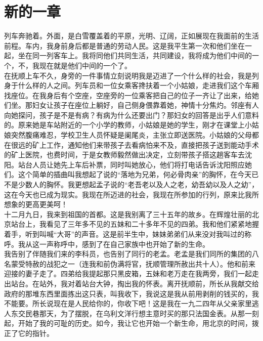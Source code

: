 \fancyhead[RO]{} %
\fancyhead[LE]{} %
\chapter*{新的一章}
\thispagestyle{empty}
列车奔驰着。外面，是白雪覆盖着的平原，光明、辽阔，正如展现在我面前的生活前程。车内，我身前身后都是普通的劳动人民。这是我平生第一次和他们坐在一起，坐在同一列客车上。我将同他们共同生活，共同建设，我将成为他们中间的一个，不，我现在就是他们中间的一个了。\\

在抚顺上车不久，身旁的一件事情立刻说明我是迈进了一个什么样的社会，我是列身于什么样的人之间。列车员和一位女乘客搀扶着一个小姑娘，走进我们这个车厢找座位。在我身后有个空座，空座旁的一位乘客把自己的位子一齐让了出来，给她们坐。那妇女让孩子在座位上躺好，自己侧身偎靠着她，神情十分焦灼。邻座有人向她探问，孩子是不是有病？有病为什么还要出门？那妇女的回答是出乎人们意料的。原来她是车站附近的一个小学的教师，小姑娘是她的学生，刚才在课堂上小姑娘突然腹痛难忍，学校卫生人员怀疑是阑尾炎，主张立即送医院。小姑娘的父母都在很远的矿上工作，通知他们来带孩子去看病怕来不及，直接把孩子送到能动手术的矿上医院，也费时间，于是女教师毅然做出决定，立刻带孩子搭这趟客车去沈阳。站台人员让她先上车后补票，同时叫她放心，他们将打电话告诉沈阳照应她们。这个简单的插曲叫我想起了说的“落地为兄弟，何必骨肉亲”的胸怀，在今天已不是少数人的胸怀。我更想起孟子说的“老吾老以及人之老，幼吾幼以及人之幼”，这在今天也已成为现实。我现在所迈进的社会，我现在所参加的行列，原来比我所想象的更高更美呵！\\

十二月九日，我来到祖国的首都。这是我别离了三十五年的故乡。在辉煌壮丽的北京站台上，我看见了三年多不见的五妹和二十多年不见的四弟。我和他们紧紧地握着手，听到叫喊“大哥”的声音。这是前半生中，妹妹弟弟们从来没对我叫过的称呼。我从这一声称呼中，感到了在自己家族中也开始了新的生命。\\

我告别了伴随我们来的李科员，也告别了同行的老孟。老孟是我们同所的集团的八名蒙受特赦的战犯之一（连我和前伪满将官，抚顺管理所赦出共十人）。他和前来迎接的妻子走了。四弟给我提起那只黑皮箱，五妹和老万走在我两旁，我们一起走出站台。在站外，我对着站台大钟，掏出我的怀表。离开抚顺前，所长从我献交给政府的那堆东西里面拣出这只表，叫我收下，我说这是我从前用剥削的钱买的，我不能要。所长说现在是人民给你的，你收下吧！这是我在一九二四年从父亲家里逃人东交民巷那天，为了摆脱，在乌利文洋行想主意时买的那只法国金表。从那一刻起，开始了我的可耻的历史。如今，我让它也开始一个新生命，用北京的时间，拨正了它的指针。\\

